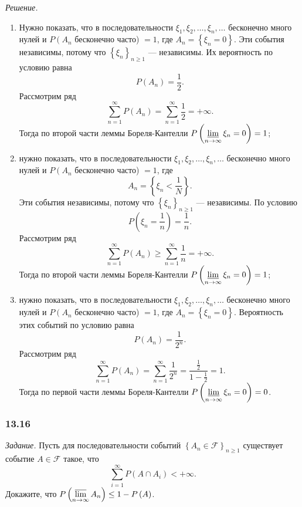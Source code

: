 \textit{Решение.}
\begin{enumerate}[label=\alph*)]
\item Нужно показать,
что в последовательности $ \xi_1, \xi_2, \dotsc, \xi_n, \dotsc $ бесконечно много нулей и $P \left( A_n \right.$ бесконечно часто) $= 1$,
где $A_n = \left\{ \xi_n = 0 \right\} $.
Эти события независимы, потому что $ \left\{ \xi_n \right\}_{n \geq 1}$ --- независимы.
Их вероятность по условию равна
$$P \left( A_n \right) =
\frac{1}{2}.$$
Рассмотрим ряд
$$ \sum \limits_{n=1}^{ \infty } P \left( A_n \right) =
\sum \limits_{n=1}^{ \infty } \frac{1}{2} =
+ \infty.$$
Тогда по второй части леммы Бореля-Кантелли $P \left( \varliminf \limits_{n \to \infty } \xi_n = 0 \right) = 1$;
\item нужно показать,
что в последовательности $ \xi_1, \xi_2, \dotsc, \xi_n, \dotsc $ бесконечно много нулей и $P \left( A_n \right.$ бесконечно часто) $= 1$,
где
$$A_n =
\left\{ \xi_n < \frac{1}{N} \right\}.$$
Эти события независимы, потому что $ \left\{ \xi_n \right\}_{n \geq 1}$ --- независимы.
По условию
$$P \left( \xi_n = \frac{1}{n} \right) =
\frac{1}{n}.$$
Рассмотрим ряд
$$ \sum \limits_{n=1}^{ \infty } P \left( A_n \right) \geq
\sum \limits_{n=1}^{ \infty } \frac{1}{n} =
+ \infty.$$
Тогда по второй части леммы Бореля-Кантелли $P \left( \varliminf \limits_{n \to \infty } \xi_n = 0 \right) = 1$;
\item нужно показать,
что в последовательности $ \xi_1, \xi_2, \dotsc, \xi_n, \dotsc $ бесконечно много нулей и $P \left( A_n \right.$ бесконечно часто) $= 1$,
где $A_n = \left\{ \xi_n = 0 \right\} $.
Вероятность этих событий по условию равна
$$P \left( A_n \right) =
\frac{1}{2^n}.$$
Рассмотрим ряд
$$ \sum \limits_{n=1}^{ \infty } P \left( A_n \right) =
\sum \limits_{n=1}^{ \infty } \frac{1}{2^n} =
\frac{ \frac{1}{2}}{1 - \frac{1}{2}} =
1.$$
Тогда по первой части леммы Бореля-Кантелли $P \left( \varliminf \limits_{n \to \infty } \xi_n = 0 \right) = 0$.
\end{enumerate}

\subsubsection*{13.16}

\textit{Задание.} Пусть для последовательности событий $ \left\{ A_n \in \mathcal{F} \right\}_{n \geq 1}$ существует событие $A \in \mathcal{F}$ такое, что
$$ \sum \limits_{i=1}^{ \infty } P \left( A \cap A_i \right) < + \infty.$$
Докажите, что $P \left( \varlimsup \limits_{n \to \infty } A_n \right) \leq 1 - P \left( A \right) $.

